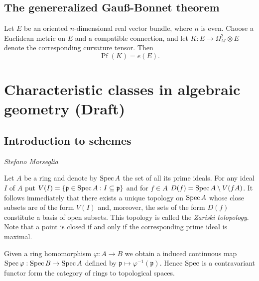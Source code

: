 \documentclass[a4paper,openany]{scrbook}
\newcommand{\chapterauthor}[1]{\hfill\emph{#1}\par\noindent}
\begin{document}
\section{The genereralized Gauß-Bonnet theorem}


\begin{thm}
Let $E$ be an oriented $n$-dimensional real vector bundle, where $n$ is even. Choose a Euclidean metric on $E$ and a compatible connection, and let $K\colon E \to \Omega^2_M \otimes E$ denote the corresponding curvature tensor. Then
\[
\operatorname{Pf}(K) = e(E).
\]
\end{thm}


\chapter{Characteristic classes in algebraic geometry (Draft)}
\section{Introduction to schemes}
\chapterauthor{Stefano Marseglia}

Let $A$ be a ring and denote by $\operatorname{Spec} A$ the set of all its prime ideals. For any ideal $I$ of $A$ put
$V(I)=\{\mathfrak p \in \operatorname{Spec} A : I \subseteq \mathfrak p\}$
and for $f\in A$
$D(f)= \operatorname{Spec} A\setminus V(fA)$.
It follows immediately that there exists a unique topology on $\operatorname{Spec} A$ whose close subsets are of the form $V(I)$ and, moreover, the sets of the form $D(f)$ constitute a basis of open subsets. This topology is called the \emph{Zariski tolopology}. Note that a point is closed if and only if the corresponding prime ideal is maximal.

Given a ring homomorphism $\varphi:A\to B$ we obtain a induced continuous map $\operatorname{Spec} \varphi: \operatorname{Spec} B \to \operatorname{Spec} A$ defined by $\mathfrak p \mapsto \varphi^{-1}(\mathfrak p)$. Hence $\operatorname{Spec}$ is a contravariant functor form the category of rings to topological spaces.
\end{document}
